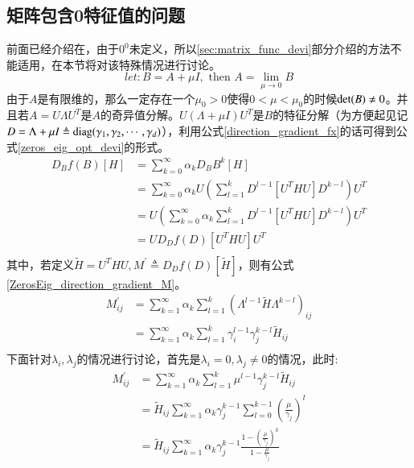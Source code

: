 \subsection{矩阵包含0特征值的问题}
\label{sec:With_Zeros_Eigenvalue}
前面已经介绍在，由于$0^{0}$未定义，所以\ref{sec:matrix_func_devi}部分介绍的方法不能适用，在本节将对该特殊情况进行讨论。
\begin{equation}
\label{zeros_eig_opt_normalization}
let:B=A+\mu I,\text{ then } A=\lim_{\mu \rightarrow 0}B
\end{equation}
由于$A$是有限维的，那么一定存在一个$\mu_0>0$使得$0<\mu<\mu_0$的时候${\rm det}(B)\neq 0$。并且若$A=U\Lambda U^{T}$是$A$的奇异值分解。$U(\Lambda+\mu I) U^{T}$是$B$的特征分解（为方便起见记$D=\Lambda+\mu I \triangleq {\rm diag}(\gamma_1,\gamma_2,\cdots,\gamma_d)$），利用公式\ref{direction_gradient_fx}的话可得到公式\ref{zeros_eig_opt_devi}的形式。
\begin{equation}
\label{zeros_eig_opt_devi}
\begin{split}
D_{B}f(B)[H]&=\sum_{k=0}^{\infty}\alpha_{k}D_{B}B^{k}[H]\\
&=\sum_{k=0}^{\infty}\alpha_{k}U\left(\sum_{l=1}^{k}D^{l-1}[U^{T}HU]D^{k-l}\right)U^{T}\\
&=U\left(\sum_{k=0}^{\infty}\alpha_{k}\sum_{l=1}^{k}D^{l-1}[U^{T}HU]D^{k-l}\right)U^{T}\\
&=UD_{D}f(D)[U^{T}HU]U^{T}\\
\end{split}
\end{equation}
其中，若定义$\tilde{H}=U^{T}HU,M^{\prime}\triangleq D_{D}f(D)[\tilde{H}]$，则有公式\ref{ZerosEig_direction_gradient_M}。
\begin{equation}
\label{ZerosEig_direction_gradient_M}
\begin{split}
M_{ij}^{\prime}&=\sum_{k=1}^{\infty} \alpha_{k}\sum_{l=1}^{k}(\Lambda^{l-1}\tilde{H}\Lambda^{k-l})_{ij}\\
&=\sum_{k=1}^{\infty} \alpha_{k}\sum_{l=1}^{k}\gamma_{i}^{l-1}\gamma_{j}^{k-l}\tilde{H}_{ij}\\
\end{split}
\end{equation}
下面针对$\lambda_i,\lambda_j$的情况进行讨论，首先是$\lambda_i=0,\lambda_j\neq 0$的情况，此时:
\begin{equation}
\label{ZerosEig_direction_gradient_M_1}
\begin{split}
M_{ij}^{\prime}&=\sum_{k=1}^{\infty} \alpha_{k}\sum_{l=1}^{k}\mu^{l-1}\gamma_{j}^{k-l}\tilde{H}_{ij}\\
&=\tilde{H}_{ij}\sum_{k=1}^{\infty}\alpha_{k}\gamma_{j}^{k-1}\sum_{l=0}^{k-1}\left(\frac{\mu}{\gamma_j}\right)^{l}\\
&=\tilde{H}_{ij}\sum_{k=1}^{\infty}\alpha_{k}\gamma_{j}^{k-1}\frac{1-\left(\frac{\mu}{\gamma_{j}}\right)^{k}}{1-\frac{\mu}{\gamma_{j}}}\\
\end{split}
\end{equation}
